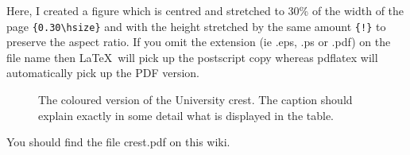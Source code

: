 \documentclass[12pt,a4paper]{report}
\begin{document}
Here, I created a figure which is centred and stretched to 30\% of the
width of the page \verb+{0.30\hsize}+ and with the height stretched by
the same amount \verb+{!}+ to preserve the aspect ratio. If you omit
the extension (ie .eps, .ps or .pdf) on the file name then \LaTeX\ will
pick up the postscript copy whereas pdflatex will automatically pick
up the PDF version.


\begin{figure}

\begin{center}
\end{center}

\caption{The coloured version of the University crest. The caption should explain exactly in some detail what is displayed in the table.}
\label{fig:eucrest}

\end{figure}

You should find the file crest.pdf on this wiki.
\end{document}
